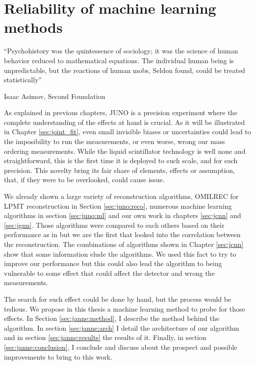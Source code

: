 \documentclass[../main.tex]{subfiles}
\begin{document}
\chapter{Reliability of machine learning methods}
\label{sec:janne}

\epigraph{``Psychohistory was the quintessence of sociology; it was the science of human behavior reduced to mathematical equations. The individual human being is unpredictable, but the reactions of human mobs, Seldon found, could be treated statistically''}{Isaac Asimov, Second Foundation}

\minitoc

As explained in previous chapters, JUNO is a precision experiment where the complete understanding of the effects at hand is crucial. As it will be illustrated in Chapter \ref{sec:joint_fit}, even small invisible biases or uncertainties could lead to the imposibility to run the measurements, or even worse, wrong our mass ordering measurements. While the liquid scintillator technology is well none and straightforward, this is the first time it is deployed to such scale, and for such precision. This novelty bring its fair share of elements, effects or assumption, that, if they were to be overlooked, could cause issue.

We already shown a large variety of reconstruction algorithms, OMILREC for LPMT reconstruction in Section \ref{sec:juno:reco}, numerous machine learning algorithms in section \ref{sec:juno:ml} and our own work in chapters \ref{sec:jcnn} and \ref{sec:jgnn}. Those algorithms were compared to each others based on their performance as in \cite{qian_vertex_2021} but we are the first that looked into the correlation between the reconstruction. The combinations of algorithms shown in Chapter \ref{sec:jcnn} show that some information elude the algorithms. We used this fact to try to improve our performance but this could also lead the algorithm to being vulnerable to some effect that could affect the detector and wrong the measurements.

The search for such effect could be done by hand, but the process would be tedious. We propose in this thesis a machine learning method to probe for those effects.  In Section \ref{sec:janne:method}, I describe the method behind the algorithm. In section \ref{sec:janne:arch} I detail the architecture of our algorithm and in section \ref{sec:janne:results} the results of it. Finally, in section \ref{sec:janne:conclusion}, I conclude and discuss about the prospect and possible improvements to bring to this work.
\end{document}
